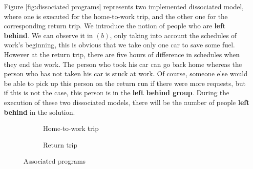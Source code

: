 \documentclass[12pt, a4paper, twoside]{memoir}
\begin{document}
{	Figure \ref{fig:dissociated programs} represents two implemented dissociated model, where one is executed for the home-to-work trip, and the other one for the corresponding return trip. \newline
	We introduce the notion of people who are \textbf{left behind}. We can observe it in $(b)$, only taking into account the schedules of work's beginning, this is obvious that we take only one car to save some fuel. However at the return trip, there are five hours of difference in schedules when they end the work. The person who took his car can go back home whereas the person who has not taken his car is stuck at work. \newline
	Of course, someone else would be able to pick up this person on the return run if there were more requests, but if this is not the case, this person is in the \textbf{left behind group}.\newline
	During the execution of these two dissociated models, there will be the number of people \textbf{left behind} in the solution.
	
	\begin{figure}[H]
		\centering
		\begin{subfigure}{.5\textwidth}
			\centering
			\caption{Home-to-work trip}
		\end{subfigure}%
		\begin{subfigure}{.5\textwidth}
			\centering
			\caption{Return trip}
		\end{subfigure}
		\caption{Associated programs}
		\label{fig:associated programs}
	\end{figure}
	
}
\end{document}

